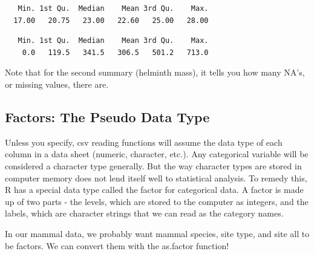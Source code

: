 \documentclass[
  letterpaper,
  DIV=11,
  numbers=noendperiod]{scrreprt}
\newenvironment{Shaded}{\begin{snugshade}}{\end{snugshade}}
\newcommand{\DocumentationTok}[1]{\textcolor[rgb]{0.37,0.37,0.37}{\textit{#1}}}
\newcommand{\FunctionTok}[1]{\textcolor[rgb]{0.28,0.35,0.67}{#1}}
\newcommand{\NormalTok}[1]{\textcolor[rgb]{0.00,0.23,0.31}{#1}}
\newcommand{\OtherTok}[1]{\textcolor[rgb]{0.00,0.23,0.31}{#1}}
\newcommand{\SpecialCharTok}[1]{\textcolor[rgb]{0.37,0.37,0.37}{#1}}
\begin{document}
\begin{verbatim}
   Min. 1st Qu.  Median    Mean 3rd Qu.    Max. 
  17.00   20.75   23.00   22.60   25.00   28.00 
\end{verbatim}

\begin{Shaded}
\end{Shaded}

\begin{verbatim}
   Min. 1st Qu.  Median    Mean 3rd Qu.    Max. 
    0.0   119.5   341.5   306.5   501.2   713.0 
\end{verbatim}

Note that for the second summary (helminth mass), it tells you how many
NA's, or missing values, there are.

\hypertarget{sec-factors}{%
\subsection{Factors: The Pseudo Data Type}\label{sec-factors}}

Unless you specify, csv reading functions will assume the data type of
each column in a data sheet (numeric, character, etc.). Any categorical
variable will be considered a character type generally. But the way
character types are stored in computer memory does not lend itself well
to statistical analysis. To remedy this, R has a special data type
called the factor for categorical data. A factor is made up of two parts
- the levels, which are stored to the computer as integers, and the
labels, which are character strings that we can read as the category
names.

In our mammal data, we probably want mammal species, site type, and site
all to be factors. We can convert them with the as.factor function!

\begin{Shaded}
\end{Shaded}
\end{document}
